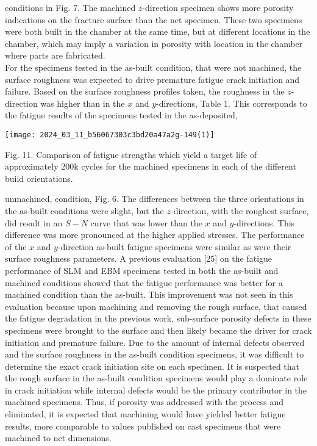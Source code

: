 \documentclass[10pt]{article}
\begin{document}
conditions in Fig. 7. The machined $z$-direction specimen shows more porosity indications on the fracture surface than the net specimen. These two specimens were both built in the chamber at the same time, but at different locations in the chamber, which may imply a variation in porosity with location in the chamber where parts are fabricated.\\
For the specimens tested in the as-built condition, that were not machined, the surface roughness was expected to drive premature fatigue crack initiation and failure. Based on the surface roughness profiles taken, the roughness in the $z$-direction was higher than in the $x$ and $y$-directions, Table 1. This corresponds to the fatigue results of the specimens tested in the as-deposited,

\begin{center}
\texttt{[image: 2024\_03\_11\_b56067303c3bd20a47a2g-149(1)]}
\end{center}

Fig. 11. Comparison of fatigue strengths which yield a target life of approximately 200k cycles for the machined specimens in each of the different build orientations.

unmachined, condition, Fig. 6. The differences between the three orientations in the as-built conditions were slight, but the $z$-direction, with the roughest surface, did result in an $S-N$ curve that was lower than the $x$ and $y$-directions. This difference was more pronounced at the higher applied stresses. The performance of the $x$ and $y$-direction as-built fatigue specimens were similar as were their surface roughness parameters. A previous evaluation [25] on the fatigue performance of SLM and EBM specimens tested in both the as-built and machined conditions showed that the fatigue performance was better for a machined condition than the as-built. This improvement was not seen in this evaluation because upon machining and removing the rough surface, that caused the fatigue degradation in the previous work, sub-surface porosity defects in these specimens were brought to the surface and then likely became the driver for crack initiation and premature failure. Due to the amount of internal defects observed and the surface roughness in the as-built condition specimens, it was difficult to determine the exact crack initiation site on each specimen. It is suspected that the rough surface in the as-built condition specimens would play a dominate role in crack initiation while internal defects would be the primary contributor in the machined specimens. Thus, if porosity was addressed with the process and eliminated, it is expected that machining would have yielded better fatigue results, more comparable to values published on cast specimens that were machined to net dimensions.
\end{document}
